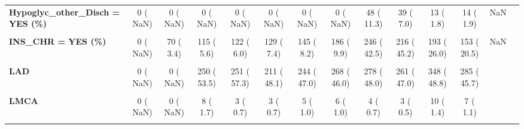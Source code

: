 \documentclass[
]{article}
\begin{document}
\begin{table}[H]
\begin{tabular}[t]{>{\raggedright\arraybackslash}p{5em}ccccccccccccc}
\textbf{Hypoglyc\_other\_Disch = YES (\%)} & 0 (  NaN) & 0 (  NaN) & 0 (  NaN) & 0 (  NaN) & 0 (  NaN) & 0 (  NaN) & 0 (  NaN) & 48 ( 11.3) & 39 (  7.0) & 13 (  1.8) & 14 (  1.9) & NaN & \\
\textbf{\cellcolor{gray!10}{Hypoglyc\_other\_Hosp = YES (\%)}} & \cellcolor{gray!10}{0 (  NaN)} & \cellcolor{gray!10}{0 (  NaN)} & \cellcolor{gray!10}{0 (  NaN)} & \cellcolor{gray!10}{0 (  NaN)} & \cellcolor{gray!10}{0 (  NaN)} & \cellcolor{gray!10}{0 (  NaN)} & \cellcolor{gray!10}{0 (  NaN)} & \cellcolor{gray!10}{33 (  8.2)} & \cellcolor{gray!10}{40 (  7.2)} & \cellcolor{gray!10}{6 (  0.8)} & \cellcolor{gray!10}{6 (  0.8)} & \cellcolor{gray!10}{NaN} & \cellcolor{gray!10}{}\\
\textbf{INS\_CHR = YES (\%)} & 0 (  NaN) & 70 (  3.4) & 115 (  5.6) & 122 (  6.0) & 129 (  7.4) & 145 (  8.2) & 186 (  9.9) & 246 ( 42.5) & 216 ( 45.2) & 193 ( 26.0) & 153 ( 20.5) & NaN & \\
\textbf{\cellcolor{gray!10}{IRA (\%)}} & \cellcolor{gray!10}{} & \cellcolor{gray!10}{} & \cellcolor{gray!10}{} & \cellcolor{gray!10}{} & \cellcolor{gray!10}{} & \cellcolor{gray!10}{} & \cellcolor{gray!10}{} & \cellcolor{gray!10}{} & \cellcolor{gray!10}{} & \cellcolor{gray!10}{} & \cellcolor{gray!10}{} & \cellcolor{gray!10}{NaN} & \cellcolor{gray!10}{}\\
\textbf{LAD} & 0 (  NaN) & 0 (  NaN) & 250 ( 53.5) & 251 ( 57.3) & 211 ( 48.1) & 244 ( 47.0) & 268 ( 46.0) & 278 ( 48.0) & 261 ( 47.0) & 348 ( 48.8) & 285 ( 45.7) &  & \\
\textbf{\cellcolor{gray!10}{LCX}} & \cellcolor{gray!10}{0 (  NaN)} & \cellcolor{gray!10}{0 (  NaN)} & \cellcolor{gray!10}{63 ( 13.5)} & \cellcolor{gray!10}{54 ( 12.3)} & \cellcolor{gray!10}{54 ( 12.3)} & \cellcolor{gray!10}{71 ( 13.7)} & \cellcolor{gray!10}{100 ( 17.2)} & \cellcolor{gray!10}{80 ( 13.8)} & \cellcolor{gray!10}{70 ( 12.6)} & \cellcolor{gray!10}{113 ( 15.8)} & \cellcolor{gray!10}{102 ( 16.3)} & \cellcolor{gray!10}{} & \cellcolor{gray!10}{}\\
\textbf{LMCA} & 0 (  NaN) & 0 (  NaN) & 8 (  1.7) & 3 (  0.7) & 3 (  0.7) & 5 (  1.0) & 6 (  1.0) & 4 (  0.7) & 3 (  0.5) & 10 (  1.4) & 7 (  1.1) &  & \\
\textbf{\cellcolor{gray!10}{Other Graft}} & \cellcolor{gray!10}{0 (  NaN)} & \cellcolor{gray!10}{0 (  NaN)} & \cellcolor{gray!10}{0 (  0.0)} & \cellcolor{gray!10}{0 (  0.0)} & \cellcolor{gray!10}{0 (  0.0)} & \cellcolor{gray!10}{0 (  0.0)} & \cellcolor{gray!10}{0 (  0.0)} & \cellcolor{gray!10}{4 (  0.7)} & \cellcolor{gray!10}{1 (  0.2)} & \cellcolor{gray!10}{2 (  0.3)} & \cellcolor{gray!10}{6 (  1.0)} & \cellcolor{gray!10}{} & \cellcolor{gray!10}{}\\

\end{tabular}
\end{table}
\end{document}

